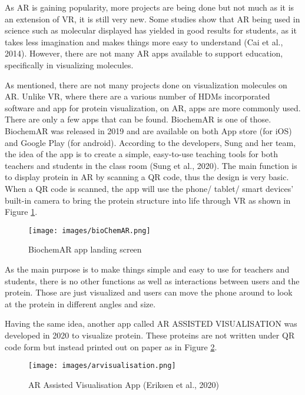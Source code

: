 As AR is gaining popularity, more projects are being done but not much as it is an extension of VR, it is still very new. Some studies show that AR being used in science such as molecular displayed has yielded in good results for students, as it takes less imagination and makes things more easy to understand (Cai et al., 2014). However, there are not many AR apps available to support education, specifically in visualizing molecules. 

As mentioned, there are not many projects done on visualization molecules on AR. Unlike VR, where there are a various number of HDMs incorporated software and app for protein visualization, on AR, apps are more commonly used. There are only a few apps that can be found. BiochemAR is one of those. BiochemAR was released in 2019 and are available on both App store (for iOS) and Google Play (for android). According to the developers, Sung and her team, the idea of the app is to create a simple, easy-to-use teaching tools for both teachers and students in the class room (Sung et al., 2020). The main function is to display protein in AR by scanning a QR code, thus the design is very basic. When a QR code is scanned, the app will use the phone/ tablet/ smart devices’ built-in camera to bring the protein structure into life through VR as shown in Figure \ref{fig:bioChemAR}.
\begin{figure}[!htbp]
	\centering
	\texttt{[image: images/bioChemAR.png]}
	\caption{BiochemAR app landing screen}
	\label{fig:bioChemAR}
\end{figure}





As the main purpose is to make things simple and easy to use for teachers and students, there is no other functions as well as interactions between users and the protein. Those are just visualized and users can move the phone around to look at the protein in different angles and size. 

Having the same idea, another app called {\footnotesize AR ASSISTED VISUALISATION}
was developed in 2020 to visualize protein. These proteins are not written under QR code form but instead printed out on paper as in Figure \ref{fig:arvisualisation}. 

\begin{figure}[!htbp]
	\centering
	\texttt{[image: images/arvisualisation.png]}
	\caption{AR Assisted Visualisation App (Eriksen et al., 2020)}
	\label{fig:arvisualisation}
\end{figure}

